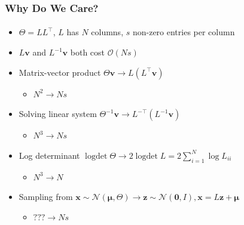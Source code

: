 \documentclass{beamer}                             %
\renewcommand{\vec}[1]{\bm{#1}}
\DeclareMathOperator{\logdet}{logdet}
\begin{document}
\begin{frame}
\frametitle{Why Do We Care?}
\framesubtitle{}

\begin{itemize}
  \item \( \Theta = L L^{\top} \), \( L \) has \( N
    \) columns, \( s \) non-zero entries per column
  \item \( L \vec{v} \) and \( L^{-1} \vec{v} \)
    both cost \( \mathcal{O}(Ns) \)
  \item Matrix-vector product
    \( \Theta \vec{v} \rightarrow L (L^{\top} \vec{v}) \)
    \begin{itemize}
      \item \( N^2 \rightarrow Ns \)
    \end{itemize}
  \item Solving linear system
    \( \Theta^{-1} \vec{v} \rightarrow L^{-\top} (L^{-1} \vec{v}) \)
    \begin{itemize}
      \item \( N^3 \rightarrow Ns \)
    \end{itemize}
  \item Log determinant
    \( \logdet \Theta \rightarrow 2 \logdet L = 2 \sum_{i = 1}^N \log L_{ii} \)
    \begin{itemize}
      \item \( N^3 \rightarrow N \)
    \end{itemize}
  \item Sampling from
    \( \vec{x} \sim \mathcal{N}(\vec{\mu}, \Theta) \rightarrow
    \vec{z} \sim \mathcal{N}(\vec{0}, I), \vec{x} = L \vec{z} + \vec{\mu} \)
    \begin{itemize}
      \item \( \text{???} \rightarrow Ns \)
    \end{itemize}
\end{itemize}
\end{frame}
\end{document}
